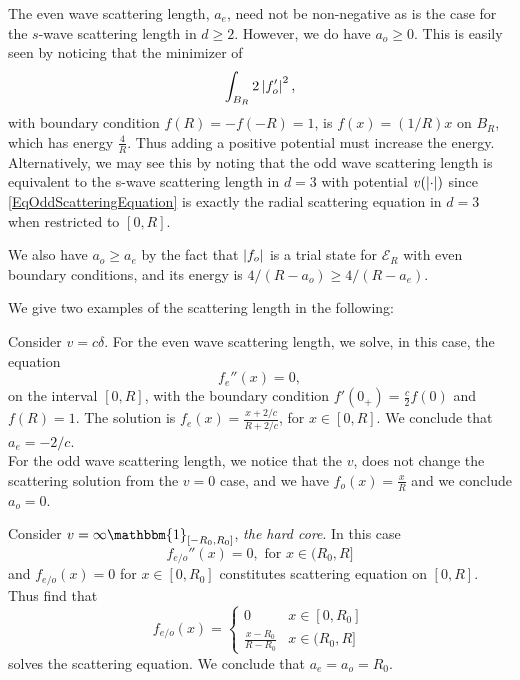\begin{remark}
	The even wave scattering length, $ a_e $, need not be non-negative as is the case for the $ s $-wave scattering length in $ d\geq 2 $. However, we do have $ a_o\geq 0 $. This is easily seen by noticing that the minimizer of \begin{equation}
	\int_{B_R} 2\left\lvert f_o' \right\rvert^2,
	\end{equation}
	with boundary condition $ f(R)=-f(-R)=1 $, is $ f(x)=(1/R) x $ on $ B_R $, which has energy $ \frac{4}{R} $. Thus adding a positive potential must increase the energy. \\
	Alternatively, we may see this by noting that the odd wave scattering length is equivalent to the s-wave scattering length in $ d=3 $ with potential $ v(\left\lvert \cdot \right\rvert) $ since 
	\eqref{EqOddScatteringEquation} is exactly the radial scattering equation in $ d=3 $ when restricted to $ [0,R] $.
\end{remark}
\begin{remark}
	We also have $ a_o\geq a_e $ by the fact that $ \left\lvert f_o \right\rvert $ is a trial state for $ \mathcal{E}_R $ with even boundary conditions, and its energy is $ 4/(R-a_o)\geq 4/(R-a_e) $.
\end{remark}
We give two examples of the scattering length in the following:
\begin{example}\label{ExampleScatteringLengthDelta}
	Consider $ v=c\delta $. For the even wave scattering length, we solve, in this case, the equation \begin{equation}
	f_e''(x)=0,
	\end{equation}
	on the interval $ [0,R] $, with the boundary condition $ f'(0_+)=\frac{c}{2}f(0) $ and $ f(R)=1 $.
	The solution is $ f_e(x)=\frac{x+2/c}{R+2/c} $, for $ x\in[0,R] $. We conclude that $ a_e=-2/c $.\\
	For the odd wave scattering length, we notice that the $ v $, does not change the scattering solution from the $ v=0 $ case, and we have $ f_o(x)=\frac{x}{R} $ and we conclude $ a_o=0 $.
\end{example}
\begin{example}\label{ExampleScatteringLengthHardCore}
	Consider $ v=\infty\mathbbm{1}_{[-R_0,R_0]} $, \ie \emph{the hard core}. In this case \begin{equation}
	f_{e/o}''(x)=0,\text{ for } x\in(R_0,R]
	\end{equation}
	and $ f_{e/o}(x)=0 $ for $ x\in [0,R_0] $ constitutes scattering equation on $ [0,R] $. Thus find that \begin{equation}
	f_{e/o}(x)=\begin{cases}
	0& x\in[0,R_0]\\
	\frac{x-R_0}{R-R_0}& x\in(R_0,R]
	\end{cases}
	\end{equation}
	solves the scattering equation. We conclude that $ a_e=a_o=R_0 $.
\end{example}

